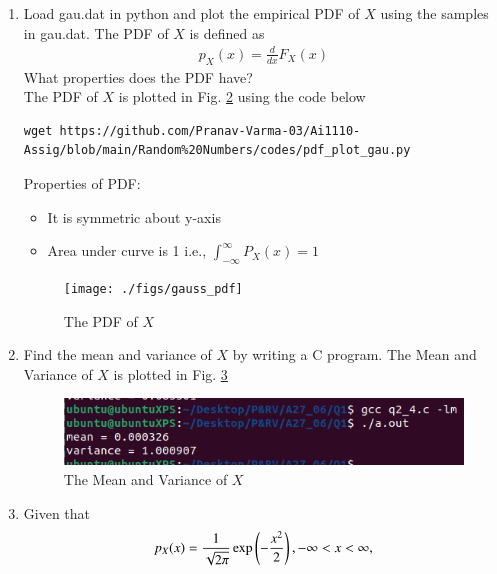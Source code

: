 \documentclass[journal,12pt,twocolumn]{IEEEtran}
\renewcommand\thesection{\arabic{section}}
\begin{document}
\begin{enumerate}[label=\thesection.\arabic*
,ref=\thesection.\theenumi]
\begin{figure}[ht]
\caption{The CDF of $X$}
\label{fig:gauss_cdf}
\end{figure}
Properties of CDF:
\begin{itemize}
    \item cdf is non decreasing fucntion
    \item $\lim_{x \to -\infty} f(x) = 0$
    \item $\lim_{x \to +\infty} f(x) = 1$
\end{itemize}
\item
Load gau.dat in python and plot the empirical PDF of $X$ using the samples in gau.dat. The PDF of $X$ is defined as
\begin{align}
p_{X}(x) = \frac{d}{dx}F_{X}(x)
\end{align}
What properties does the PDF have?
\\
\solution The PDF of $X$ is plotted in Fig. \ref{fig:gauss_pdf} using the code below
\begin{lstlisting}
wget https://github.com/Pranav-Varma-03/Ai1110-Assig/blob/main/Random%20Numbers/codes/pdf_plot_gau.py
\end{lstlisting}
Properties of PDF:
\begin{itemize}
    \item It is symmetric about y-axis
    \item Area under curve is 1 i.e., $\int_{-\infty}^{\infty} P_X(x) = 1$
\end{itemize}
\begin{figure}
\centering
\texttt{[image: ./figs/gauss\_pdf]}
\caption{The PDF of $X$}
\label{fig:gauss_pdf}
\end{figure}
\item Find the mean and variance of $X$ by writing a C program.
\solution The Mean and Variance of $X$ is plotted in Fig. \ref{fig:mean_variance}
\begin{figure}[ht]
\centering
\includegraphics[width=\columnwidth]{./figs/q2.png}
\caption{The Mean and Variance of $X$}
\label{fig:mean_variance}
\end{figure}
\item Given that 
\begin{align}
p_{X}(x) = \frac{1}{\sqrt{2\pi}}\exp\left(-\frac{x^2}{2}\right), -\infty < x < \infty,
\label{eq:2.3}
\end{align}

\end{enumerate}
\end{document}
